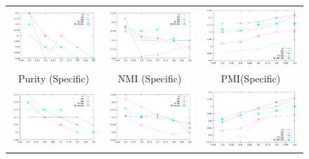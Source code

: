 \documentclass[10pt,a5paper,twoside]{article}
\begin{document}
\begin{figure}[t!]
\begin{center}
{\begin{tabular}{ccc}
		\includegraphics[width=140pt]{Figs/2-1.pdf} & 
		\includegraphics[width=140pt]{Figs/2-2.pdf} & 
		 \includegraphics[width=140pt]{Figs/2-3.pdf} \\

		{\footnotesize Purity (Specific)} & {\footnotesize NMI (Specific)} & 
		{\footnotesize PMI(Specific)}\\


		\includegraphics[width=140pt]{Figs/3-1.pdf} & 
		\includegraphics[width=140pt]{Figs/3-2.pdf} & 
		\includegraphics[width=140pt]{Figs/3-3.pdf} \\


\end{tabular}}
\end{center}
\end{figure}
\end{document}
